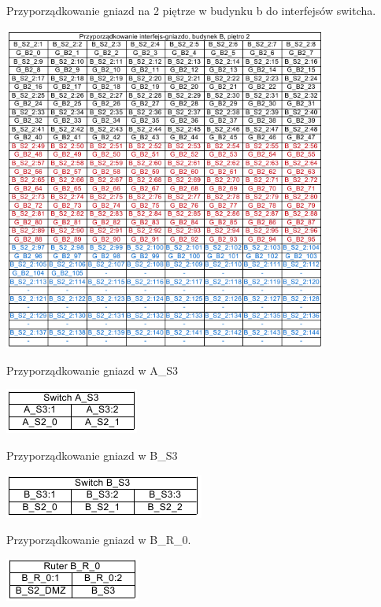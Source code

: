 \documentclass{report}
\begin{document}
\begin{table}[H]
\caption{Przyporządkowanie gniazd na 2 piętrze w budynku b do interfejsów switcha.}
 \centering
      \includegraphics[width=0.8\textwidth]{./obrazki/tab_kros/b2.png}
\end{table}

\begin{table}[H]
\caption{Przyporządkowanie gniazd w A\_S3}
 \centering
      \includegraphics{./obrazki/tab_kros/as3.png}
\end{table}

\begin{table}[H]
\caption{Przyporządkowanie gniazd w B\_S3}
 \centering
      \includegraphics{./obrazki/tab_kros/bs3.png}
\end{table}

\begin{table}[H]
\caption{Przyporządkowanie gniazd w B\_R\_0.}
 \centering
      \includegraphics{./obrazki/tab_kros/br0.png}
\end{table}
\end{document}
